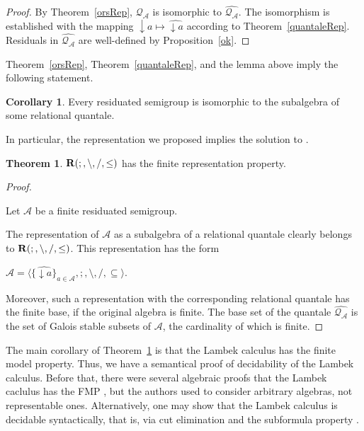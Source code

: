 \documentclass[a4paper]{article}
\theoremstyle{definition}
\theoremstyle{theorem}
\newtheorem{theorem}{Theorem}
\theoremstyle{proposition}
\theoremstyle{lemma}
\theoremstyle{ex}
\theoremstyle{corollary}
\newtheorem{corollary}{Corollary}
\theoremstyle{claim}
\begin{document}
\begin{proof}
  By Theorem~\ref{orsRep}, $\mathcal{Q}_{\mathcal{A}}$ is isomorphic to $\widehat{\mathcal{Q}_{\mathcal{A}}}$. The isomorphism is established with the mapping $\downarrow{a} \mapsto \widehat{\downarrow a}$ according to Theorem~\ref{quantaleRep}.
  Residuals in $\widehat{\mathcal{Q}_{\mathcal{A}}}$ are well-defined by Proposition~\ref{ok}.
\end{proof}

Theorem~\ref{orsRep}, Theorem~\ref{quantaleRep}, and the lemma above imply the following statement.
\begin{corollary} \label{orsRep2}
  Every residuated semigroup is isomorphic to the subalgebra of some relational quantale.
\end{corollary}

In particular, the representation we proposed implies the solution to \cite[Problem 19.17]{hirsch2002relation}.
\begin{theorem} \label{solution}
  ${\bf R}(;, \setminus, /, \leq)$ has the finite representation property.
\end{theorem}

\begin{proof}
  $ $

  Let $\mathcal{A}$ be a finite residuated semigroup.

  The representation of $\mathcal{A}$ as a subalgebra of a relational quantale clearly belongs to ${\bf R}(;, \setminus, /, \leq)$. This representation has the form

\begin{center}
  $\widehat{\mathcal{A}} = \langle \{ \widehat{\downarrow a} \}_{a \in \mathcal{A}}, ;, \setminus, /, \subseteq \rangle$.
\end{center}

  Moreover, such a representation with the corresponding relational quantale has the finite base, if the original algebra is finite. The base set of the quantale $\widehat{\mathcal{Q}_{\mathcal{A}}}$ is the set of Galois stable subsets of $\mathcal{A}$, the cardinality of which is finite.
\end{proof}

The main corollary of Theorem~\ref{solution} is that the Lambek calculus has the finite model property. Thus, we have a semantical proof of decidability of the Lambek calculus. Before that, there were several algebraic proofs that the Lambek caclulus has the FMP \cite{buszkowski2008infinitary}, but the authors used to consider arbitrary algebras, not representable ones.
Alternatively, one may show that the Lambek calculus is decidable syntactically, that is, via cut elimination and the subformula property \cite{lambek1958mathematics}.
\end{document}
